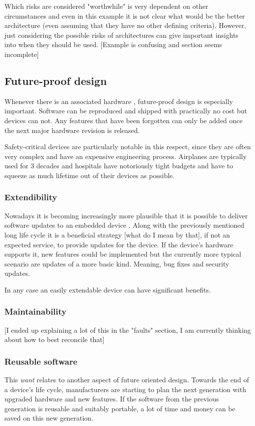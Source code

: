 Which risks are considered "worthwhile" is very dependent on other circumstances and even in this example it is not clear what would be the better architecture (even assuming that they have no other defining criteria). However, just considering the possible risks of architectures can give important insights into when they should be used.
[Example is confusing and section seems incomplete]
\subsection{Future-proof design}
Whenever there is an associated hardware , future-proof design is especially important. Software can be reproduced and shipped with practically no cost but devices can not. Any features that have been forgotten can only be added once the next major hardware revision is released.

Safety-critical devices are particularly notable in this respect, since they are often very complex and have an expensive engineering process. Airplanes are typically used for 3 decades and hospitals have notoriously tight budgets and have to squeeze as much lifetime out of their devices as possible. 
\subsubsection{Extendibility}
Nowadays it is becoming increasingly more plausible that it is possible to deliver software updates to an embedded device \cite{OndrejKachman.2016}. Along with the previously mentioned long life cycle it is a beneficial strategy [what do I mean by that], if not an expected service, to provide updates for the device.
If the device's hardware supports it, new features could be implemented but the currently more typical scenario are updates of a more basic kind. Meaning, bug fixes and security updates.

In any case an easily extendable device can have significant benefits.
\subsubsection{Maintainability}
[I ended up explaining a lot of this in the "faults" section, I am currently thinking about how to best reconcile that]
\subsubsection{Reusable software}
This \textit{want} relates to another aspect of future oriented design. Towards the end of a device's life cycle, manufacturers are starting to plan the next generation with upgraded hardware and new features. If the software from the previous generation is reusable and suitably portable, a lot of time and money can be saved on this new generation.

